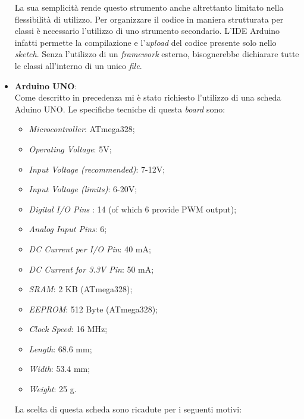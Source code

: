 \begin{itemize}
\begin{itemize}
	\end{itemize}
	La sua semplicità rende questo strumento anche altrettanto limitato nella flessibilità di utilizzo. Per organizzare il codice in maniera strutturata per classi è necessario l'utilizzo di uno strumento secondario. L'IDE Arduino infatti permette la compilazione e l'\textit{upload} del codice presente solo nello \textit{sketch}. Senza l'utilizzo di un \textit{framework} esterno, bisognerebbe dichiarare tutte le classi all'interno di un unico \textit{file}.
	
	
	\item \textbf{Arduino UNO}:\\
	Come descritto in precedenza mi è stato richiesto l'utilizzo di una scheda Aduino UNO. Le specifiche tecniche di questa \textit{board} sono:
	\begin{itemize}
	\item \textit{Microcontroller}:	ATmega328;
	\item \textit{Operating Voltage}:	5V;
	\item \textit{Input Voltage (recommended)}: 7-12V;
	\item \textit{Input Voltage (limits)}:	6-20V;
	\item \textit{Digital I/O Pins	}: 14 (of which 6 provide PWM output);
	\item \textit{Analog Input Pins}: 6;
	\item \textit{DC Current per I/O Pin}:	40 mA;
	\item \textit{DC Current for 3.3V Pin}:	50 mA;
	\item \textit{SRAM}:	2 KB (ATmega328);
	\item \textit{EEPROM}:	512 Byte (ATmega328);
	\item \textit{Clock Speed}:	16 MHz;
	\item \textit{Length}:	68.6 mm;
	\item \textit{Width}:	53.4 mm;
	\item \textit{Weight}: 	25 g.
	\end{itemize}

	La scelta di questa scheda sono ricadute per i seguenti motivi:
	\begin{itemize}
	

\end{itemize}
\end{itemize}
